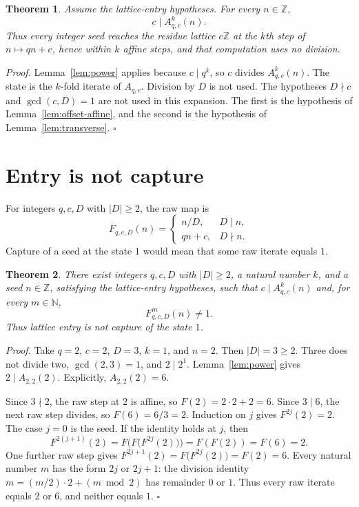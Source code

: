 \documentclass[11pt,letterpaper]{article}
\newcommand{\N}{\mathbb{N}}
\newcommand{\Z}{\mathbb{Z}}
\newtheorem{theorem}{Theorem}
\newenvironment{proof}{\noindent\textit{Proof.}}{\hfill\(\square\)}
\begin{document}
\begin{theorem}
\label{thm:entry}
Assume the lattice-entry hypotheses. For every \(n\in\Z\),
\[
c\mid A_{q,c}^{k}(n).
\]
Thus every integer seed reaches the residue lattice \(c\Z\) at the \(k\)th step of \(n\mapsto qn+c\), hence within \(k\) affine steps, and that computation uses no division.
\end{theorem}

\begin{proof}
Lemma~\ref{lem:power} applies because \(c\mid q^k\), so \(c\) divides \(A_{q,c}^{k}(n)\). The state is the \(k\)-fold iterate of \(A_{q,c}\). Division by \(D\) is not used. The hypotheses \(D\nmid c\) and \(\gcd(c,D)=1\) are not used in this expansion. The first is the hypothesis of Lemma~\ref{lem:offset-affine}, and the second is the hypothesis of Lemma~\ref{lem:transverse}.
\end{proof}

\section{Entry is not capture}

For integers \(q,c,D\) with \(|D|\ge 2\), the raw map is
\[
F_{q,c,D}(n)=
\begin{cases}
n/D,&D\mid n,\\
qn+c,&D\nmid n.
\end{cases}
\]
Capture of a seed at the state \(1\) would mean that some raw iterate equals \(1\).

\begin{theorem}
\label{thm:not-capture}
There exist integers \(q,c,D\) with \(|D|\ge 2\), a natural number \(k\), and a seed \(n\in\Z\), satisfying the lattice-entry hypotheses, such that \(c\mid A_{q,c}^{k}(n)\) and, for every \(m\in\N\),
\[
F_{q,c,D}^{m}(n)\ne 1.
\]
Thus lattice entry is not capture of the state \(1\).
\end{theorem}

\begin{proof}
Take \(q=2\), \(c=2\), \(D=3\), \(k=1\), and \(n=2\). Then \(|D|=3\ge 2\). Three does not divide two, \(\gcd(2,3)=1\), and \(2\mid 2^1\). Lemma~\ref{lem:power} gives \(2\mid A_{2,2}(2)\). Explicitly, \(A_{2,2}(2)=6\).

Since \(3\nmid 2\), the raw step at \(2\) is affine, so \(F(2)=2\cdot 2+2=6\). Since \(3\mid 6\), the next raw step divides, so \(F(6)=6/3=2\). Induction on \(j\) gives \(F^{2j}(2)=2\). The case \(j=0\) is the seed. If the identity holds at \(j\), then
\[
F^{2(j+1)}(2)=F\bigl(F\bigl(F^{2j}(2)\bigr)\bigr)=F(F(2))=F(6)=2.
\]
One further raw step gives \(F^{2j+1}(2)=F\bigl(F^{2j}(2)\bigr)=F(2)=6\). Every natural number \(m\) has the form \(2j\) or \(2j+1\): the division identity \(m=(m/2)\cdot 2+(m\bmod 2)\) has remainder \(0\) or \(1\). Thus every raw iterate equals \(2\) or \(6\), and neither equals \(1\).
\end{proof}
\end{document}
